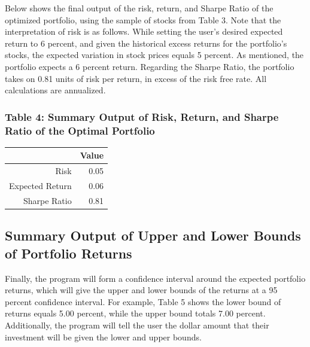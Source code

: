 \documentclass[12pt,english]{article}
\begin{document}
\begin{doublespace}
            \indent{}\indent{}
            Below shows the final output of the risk, return, and Sharpe Ratio of the optimized portfolio, using the sample of stocks from Table 3. Note that the interpretation of risk is as follows. While setting the user's desired expected return to 6 percent, and given the historical excess returns for the portfolio's stocks, the expected variation in stock prices equals 5 percent. As mentioned, the portfolio expects a 6 percent return. Regarding the Sharpe Ratio, the portfolio takes on 0.81 units of risk per return, in excess of the risk free rate. All calculations are annualized.
            
            \subsubsection{Table 4: Summary Output of Risk, Return, and Sharpe Ratio of the Optimal Portfolio}
                \begin{table}[H]
                \centering
                \begin{tabular}{rr}
                  \hline
                 & Value \\ 
                  \hline
                Risk & 0.05 \\ 
                  Expected Return & 0.06 \\ 
                  Sharpe Ratio & 0.81 \\ 
                   \hline
                \end{tabular}
                \end{table}
                
        \subsection{Summary Output of Upper and Lower Bounds of Portfolio Returns}
            
            \indent{}\indent{}
            Finally, the program will form a confidence interval around the expected portfolio returns, which will give the upper and lower bounds of the returns at a 95 percent confidence interval. For example, Table 5 shows the lower bound of returns equals 5.00 percent, while the upper bound totals 7.00 percent. Additionally, the program will tell the user the dollar amount that their investment will be given the lower and upper bounds.
    

\end{doublespace}
\end{document}
